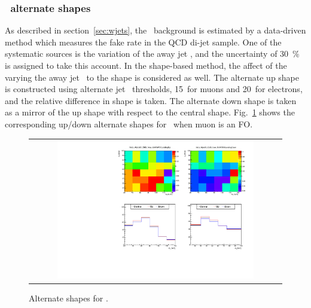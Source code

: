 \subsubsection{\Wjets\ alternate shapes} 

As described in section~\ref{sec:wjets}, the \Wjets\ background is estimated 
by a data-driven method which measures the fake rate in the QCD di-jet sample. 
One of the systematic sources is the variation of the away jet \pt,
and the uncertainty of 30~\% is assigned to take this account. 
In the shape-based method, the affect of the varying the away jet \pt\ 
to the shape is considered as well. 
The alternate up shape is constructed using alternate jet \pt\ thresholds, 
15~\GeV for muons and 20~\GeV for electrons, and the relative difference 
in shape is taken. The alternate down shape is taken as a mirror of 
the up shape with respect to the central shape. 
Fig.~\ref{fig:alter_wjets} shows the corresponding up/down alternate shapes
for \Wjets\ when muon is an FO. 
%
\begin{figure}[htp]
\centering
\begin{tabular}{c}
\includegraphics[width=0.8\textwidth]{figures/histo_WjetsM_CMS_hww_MVAWMBounding_0j_zoom.pdf}
\end{tabular}
\caption{Alternate shapes for \WjetsM. }
\label{fig:alter_wjets}
\end{figure}


